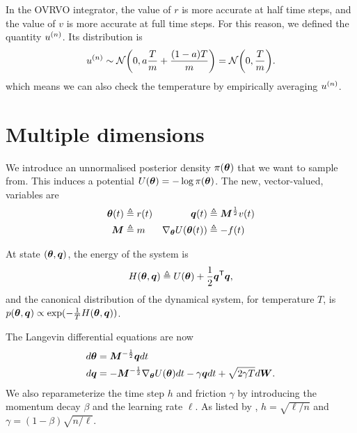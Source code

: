\documentclass{article}
\begin{document}
In the OVRVO integrator, the value of $r$ is more accurate at half
time steps, and the value of $v$ is more accurate at full time steps. For this
reason, we defined the quantity $u^{{\left( n \right)}}$. Its distribution is
\begin{equation}
  u^{{\left( n \right)}} \sim \mathcal{N}{\left( 0, a\frac{T}{m} + \frac{(1-a)T}{m} \right)} = \mathcal{N}{\left( 0, \frac{T}{m} \right)}.
\end{equation}
which means we can also check the temperature by empirically averaging $u^{{\left( n \right)}}$.

\section{Multiple dimensions}
We introduce an unnormalised posterior density  $\pi({\boldsymbol\theta})$ that we want to
sample from. This induces a potential $U({\boldsymbol\theta}) = -\log \pi({\boldsymbol\theta})$.
The new, vector-valued, variables are
\begin{align*}
{\boldsymbol\theta}(t) &\triangleq r(t) & {\bm{q}}(t) &\triangleq {\bm{M}}^{\frac{1}{2}} v(t) \\
{\bm{M}} &\triangleq m &   \nabla_{\boldsymbol\theta} U({\boldsymbol\theta}(t)) &\triangleq -f(t) \\
\end{align*}

At state $({\boldsymbol\theta}, {\bm{q}})$, the energy of the system is
\begin{equation}
  H({\boldsymbol\theta}, {\bm{q}}) \triangleq U({\boldsymbol\theta}) + \frac{1}{2}{\bm{q}}^{\mathsf{T}}{\bm{q}},
  \label{eq:energy}
\end{equation}
and the canonical distribution of the dynamical system, for temperature $T$, is $p({\boldsymbol\theta}, {\bm{q}})
\propto \exp(-\frac{1}{T}H({\boldsymbol\theta}, {\bm{q}}))$.

The Langevin differential equations are now
\begin{align}
  d{\boldsymbol\theta} &= {\bm{M}}^{-\frac{1}{2}} {\bm{q}} dt \\
  d{\bm{q}} &= - {\bm{M}}^{-\frac{1}{2}}\nabla_{\boldsymbol\theta} U({\boldsymbol\theta})dt -\gamma {\bm{q}} dt  + \sqrt{2\gamma T} d{\bm{W}}.
\end{align}
We also reparameterize the time step $h$ and friction $\gamma$ by introducing
the momentum decay $\beta$ and the learning rate $\ell$. As listed by
\citet{wenzel20posterior}, $h = \sqrt{\ell / n}$ and $\gamma = (1 - \beta)\sqrt{n / \ell}$.
\end{document}
